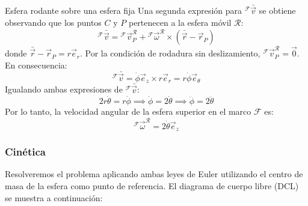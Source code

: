 \begin{solucion}{Esfera rodante sobre una esfera fija}
Una segunda expresión para ${}^{\mathcal{F}}\bar{\vec{v}}$ se obtiene observando que los puntos $C$ y $P$ pertenecen a la esfera móvil $\mathcal{R}$:
\begin{equation}
    {}^{\mathcal{F}}\bar{\vec{v}} = {}^{\mathcal{F}}\vec{v}_P^{\mathcal{R}} + {}^{\mathcal{F}}\vec{\omega}^{\mathcal{R}} \times (\bar{\vec{r}} - \vec{r}_P)
\end{equation}
donde $\bar{\vec{r}} - \vec{r}_P = r\vec{e}_r$. Por la condición de rodadura sin deslizamiento, ${}^{\mathcal{F}}\vec{v}_P^{\mathcal{R}} = \vec{0}$. En consecuencia:
\begin{equation}
    {}^{\mathcal{F}}\bar{\vec{v}} = \dot{\phi}\vec{e}_z \times r\vec{e}_r = r\dot{\phi}\vec{e}_\theta
\end{equation}
Igualando ambas expresiones de ${}^{\mathcal{F}}\bar{\vec{v}}$:
\begin{equation}
    2r\dot{\theta} = r\dot{\phi} \implies \dot{\phi} = 2\dot{\theta} \implies \ddot{\phi} = 2\ddot{\theta}
\end{equation}
Por lo tanto, la velocidad angular de la esfera superior en el marco $\mathcal{F}$ es:
\begin{equation}
    {}^{\mathcal{F}}\vec{\omega}^{\mathcal{R}} = 2\dot{\theta}\vec{e}_z
\end{equation}

\subsubsection*{Cinética}

Resolveremos el problema aplicando ambas leyes de Euler utilizando el centro de masa de la esfera como punto de referencia. El diagrama de cuerpo libre (DCL) se muestra a continuación:

\begin{center}
\end{center}


\end{solucion}
